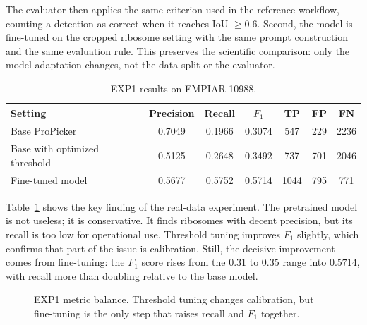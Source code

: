 \documentclass[12pt,a4paper]{report}
\begin{document}
The evaluator then applies the same criterion used in the reference workflow, counting a detection as correct when it reaches IoU \(\geq 0.6\). Second, the model is fine-tuned on the cropped ribosome setting with the same prompt construction and the same evaluation rule. This preserves the scientific comparison: only the model adaptation changes, not the data split or the evaluator.

\begin{table}[H]
  \centering
  \small
  \begin{tabular}{lcccccc}
    \toprule
    Setting & Precision & Recall & \(F_1\) & TP & FP & FN \\
    \midrule
    Base ProPicker & 0.7049 & 0.1966 & 0.3074 & 547 & 229 & 2236 \\
    Base with optimized threshold & 0.5125 & 0.2648 & 0.3492 & 737 & 701 & 2046 \\
    Fine-tuned model & 0.5677 & 0.5752 & 0.5714 & 1044 & 795 & 771 \\
    \bottomrule
  \end{tabular}
  \caption{EXP1 results on EMPIAR-10988.}
  \label{tab:exp1-results}
\end{table}

Table~\ref{tab:exp1-results} shows the key finding of the real-data experiment. The pretrained model is not useless; it is conservative. It finds ribosomes with decent precision, but its recall is too low for operational use. Threshold tuning improves \(F_1\) slightly, which confirms that part of the issue is calibration. Still, the decisive improvement comes from fine-tuning: the \(F_1\) score rises from the \(0.31\) to \(0.35\) range into \(0.5714\), with recall more than doubling relative to the base model.

\begin{figure}[H]
  \centering
  \caption{EXP1 metric balance. Threshold tuning changes calibration, but fine-tuning is the only step that raises recall and \(F_1\) together.}
  \label{fig:exp1-balance}
\end{figure}
\end{document}

